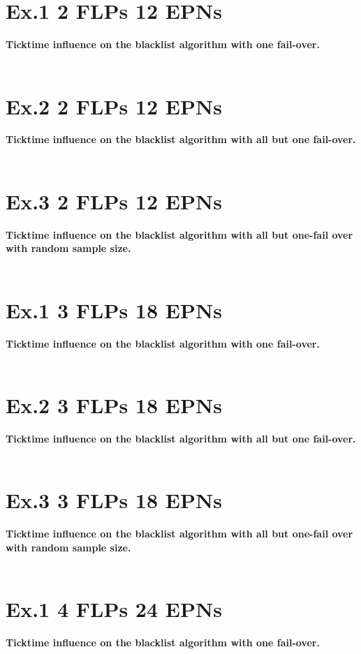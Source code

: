 \section{Ex.1 2 FLPs 12 EPNs}
\textbf{Ticktime influence on the blacklist algorithm with one fail-over.}
\\\\

\section{Ex.2 2 FLPs 12 EPNs}
\textbf{Ticktime influence on the blacklist algorithm with all but one fail-over.}
\\\\

\section{Ex.3 2 FLPs 12 EPNs}
\textbf{Ticktime influence on the blacklist algorithm with all but one-fail over with random sample size.}
\\\\

\section{Ex.1 3 FLPs 18 EPNs}
\textbf{Ticktime influence on the blacklist algorithm with one fail-over.}
\\\\

\section{Ex.2 3 FLPs 18 EPNs}
\textbf{Ticktime influence on the blacklist algorithm with all but one fail-over.}
\\\\

\section{Ex.3 3 FLPs 18 EPNs}
\textbf{Ticktime influence on the blacklist algorithm with all but one-fail over with random sample size.}
\\\\

\section{Ex.1 4 FLPs 24 EPNs}
\textbf{Ticktime influence on the blacklist algorithm with one fail-over.}
\\\\

